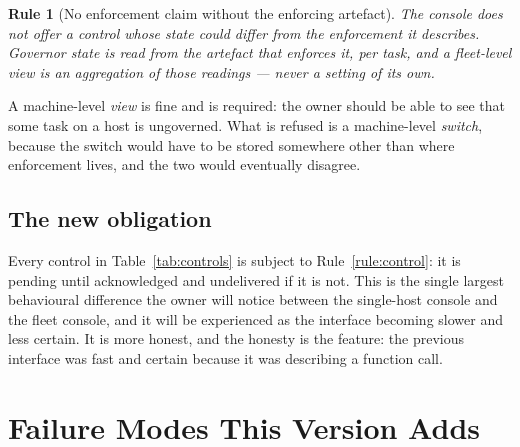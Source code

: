 \documentclass[11pt]{article}
\newtheorem{drule}{Rule}
\begin{document}
\begin{drule}[No enforcement claim without the enforcing artefact]
\label{rule:noclaim}
The console does not offer a control whose state could differ from the enforcement it describes. Governor state is read from the artefact that enforces it, per task, and a fleet-level view is an aggregation of those readings --- never a setting of its own.
\end{drule}

A machine-level \emph{view} is fine and is required: the owner should be able to see that some task on a host is ungoverned. What is refused is a machine-level \emph{switch}, because the switch would have to be stored somewhere other than where enforcement lives, and the two would eventually disagree.

\subsection{The new obligation}

Every control in Table~\ref{tab:controls} is subject to Rule~\ref{rule:control}: it is pending until acknowledged and undelivered if it is not. This is the single largest behavioural difference the owner will notice between the single-host console and the fleet console, and it will be experienced as the interface becoming slower and less certain. It is more honest, and the honesty is the feature: the previous interface was fast and certain because it was describing a function call.

\section{Failure Modes This Version Adds}
\label{sec:failures}
\end{document}
